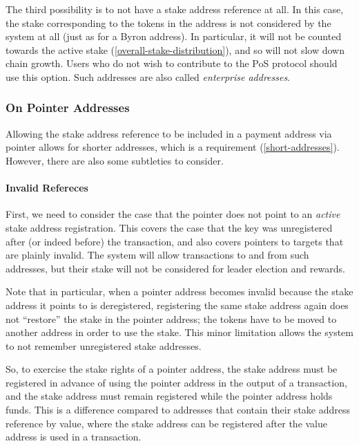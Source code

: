 \documentclass[11pt,a4paper,dvipsnames,twosided]{article}
\begin{document}
The third possibility is to not have a stake address reference at all. In this case,
the stake corresponding to the tokens in the address is not considered by the
system at all (just as for a Byron address). In particular, it will not be
counted towards the active stake (\cref{overall-stake-distribution}), and so
will not slow down chain growth. Users who do not wish to contribute to the PoS
protocol should use this option. Such addresses are also called \emph{enterprise
  addresses}.

\subsubsection{On Pointer Addresses}
\label{pointer-address}

Allowing the stake address reference to be included in a payment address via pointer
allows for shorter addresses, which is a requirement (\cref{short-addresses}).
However, there are also some subtleties to consider.

\paragraph{Invalid Refereces}
First, we need to consider the case that the pointer does not point to an
\emph{active} stake address registration. This covers the case that the key was
unregistered after (or indeed before) the transaction, and also covers pointers
to targets that are plainly invalid. The system will allow transactions to and
from such addresses, but their stake will not be considered for leader election
and rewards.

Note that in particular, when a pointer address becomes invalid because the
stake address it points to is deregistered, registering the same stake address
again does not ``restore'' the stake in the pointer address; the tokens have to
be moved to another address in order to use the stake. This minor limitation
allows the system to not remember unregistered stake addresses.


So, to exercise the stake rights of a pointer address, the stake address must be
registered in advance of using the pointer address in the output of a
transaction, and the stake address must remain registered while the pointer
address holds funds. This is a difference compared to addresses that contain
their stake address reference by value, where the stake address can be registered
after the value address is used in a transaction.
\end{document}
